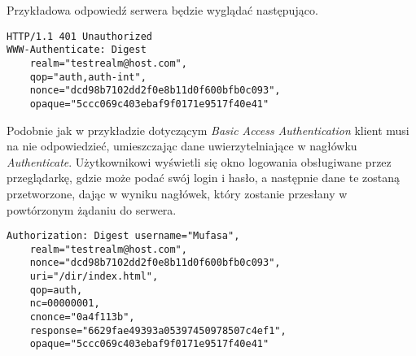 \documentclass[11pt]{aghdpl}
\begin{document}
Przykładowa odpowiedź serwera będzie wyglądać następująco.
\begin{lstlisting}
HTTP/1.1 401 Unauthorized
WWW-Authenticate: Digest
	realm="testrealm@host.com",
	qop="auth,auth-int",
	nonce="dcd98b7102dd2f0e8b11d0f600bfb0c093",
	opaque="5ccc069c403ebaf9f0171e9517f40e41"
\end{lstlisting}

Podobnie jak w przykładzie dotyczącym \emph{Basic Access Authentication} klient musi na nie odpowiedzieć, umieszczając dane uwierzytelniające w nagłówku \emph{Authenticate}. Użytkownikowi wyświetli się okno logowania obsługiwane przez przeglądarkę, gdzie może podać swój login i hasło, a następnie dane te zostaną przetworzone, dając w wyniku nagłówek, który zostanie przesłany w powtórzonym żądaniu do serwera.
\begin{lstlisting}
Authorization: Digest username="Mufasa",
	realm="testrealm@host.com",
	nonce="dcd98b7102dd2f0e8b11d0f600bfb0c093",
	uri="/dir/index.html",
	qop=auth,
	nc=00000001,
	cnonce="0a4f113b",
	response="6629fae49393a05397450978507c4ef1",
	opaque="5ccc069c403ebaf9f0171e9517f40e41"
\end{lstlisting}
\end{document}
